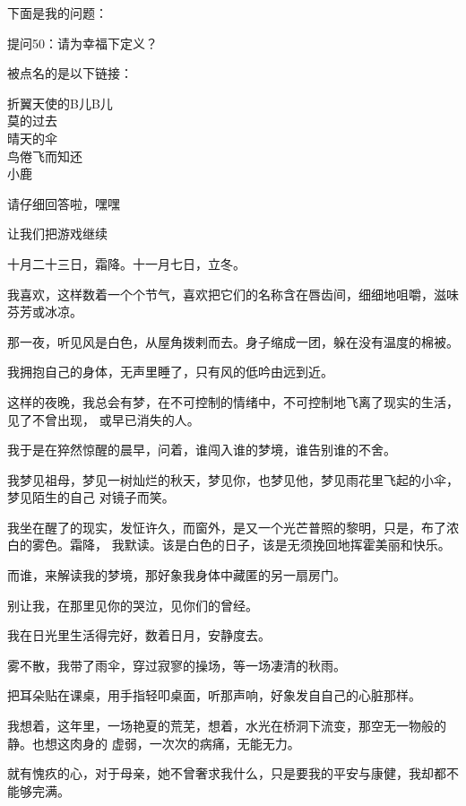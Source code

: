 		\vspace{2em}
		下面是我的问题：\par
		提问50：请为幸福下定义？

		\vspace{1em}
		被点名的是以下链接：

		\longpoem{}{}{}
			折翼天使的B儿B儿 \\
			莫的过去 \\
			晴天的伞 \\
			鸟倦飞而知还 \\
			小鹿
		\endlongpoem

		请仔细回答啦，嘿嘿


		让我们把游戏继续

	\endwriting



		十月二十三日，霜降。十一月七日，立冬。

		我喜欢，这样数着一个个节气，喜欢把它们的名称含在唇齿间，细细地咀嚼，滋味芬芳或冰凉。

		那一夜，听见风是白色，从屋角拨剌而去。身子缩成一团，躲在没有温度的棉被。

		我拥抱自己的身体，无声里睡了，只有风的低吟由远到近。

		这样的夜晚，我总会有梦，在不可控制的情绪中，不可控制地飞离了现实的生活，见了不曾出现，
	或早已消失的人。

		我于是在猝然惊醒的晨早，问着，谁闯入谁的梦境，谁告别谁的不舍。

		我梦见祖母，梦见一树灿烂的秋天，梦见你，也梦见他，梦见雨花里飞起的小伞，梦见陌生的自己
	对镜子而笑。

		我坐在醒了的现实，发怔许久，而窗外，是又一个光芒普照的黎明，只是，布了浓白的雾色。霜降，
	我默读。该是白色的日子，该是无须挽回地挥霍美丽和快乐。


		而谁，来解读我的梦境，那好象我身体中藏匿的另一扇房门。

		别让我，在那里见你的哭泣，见你们的曾经。


		我在日光里生活得完好，数着日月，安静度去。


		雾不散，我带了雨伞，穿过寂寥的操场，等一场凄清的秋雨。

		把耳朵贴在课桌，用手指轻叩桌面，听那声响，好象发自自己的心脏那样。


		我想着，这年里，一场艳夏的荒芜，想着，水光在桥洞下流变，那空无一物般的静。也想这肉身的
	虚弱，一次次的病痛，无能无力。


		就有愧疚的心，对于母亲，她不曾奢求我什么，只是要我的平安与康健，我却都不能够完满。


